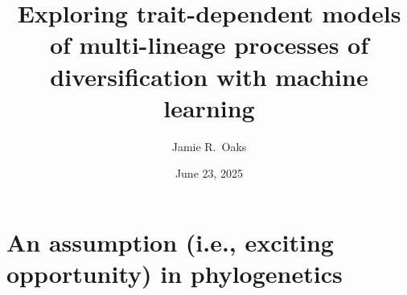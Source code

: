 





% 

\usepackage{lmodern}
\usepackage{bm}
\usepackage{pdfpages}

\usepackage{appendixnumberbeamer}


\renewcommand\footnoterule{}

\title[Trait-dependent shared divergences]{Exploring trait-dependent models of multi-lineage processes of diversification with machine learning}

\author[Jamie Oaks]{
    Jamie R.\ Oaks
}

\date{June 23, 2025}






\section{An assumption (i.e., exciting opportunity) in phylogenetics}

% 


\begin{frame}
    
\end{frame}




